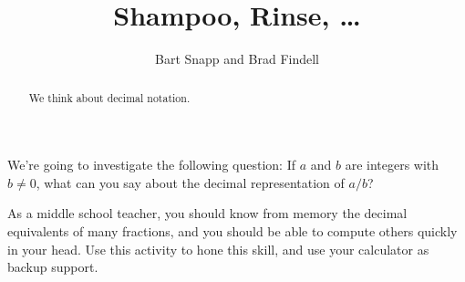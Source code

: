 \documentclass{ximera}
\title{Shampoo, Rinse, \dots}
\author{Bart Snapp and Brad Findell}
\begin{document}
\begin{abstract}
  We think about decimal notation.
\end{abstract}
\maketitle

\label{A:Shampoo}

We're going to investigate the following question: If $a$ and $b$ are
integers with $b \ne 0$, what can you say about the decimal
representation of $a/b$? 

As a middle school teacher, you should know from memory the decimal equivalents of many fractions, and 
you should be able to compute others quickly in your head.  Use this activity to hone this skill, and use your calculator 
as backup support.  
\end{document}
